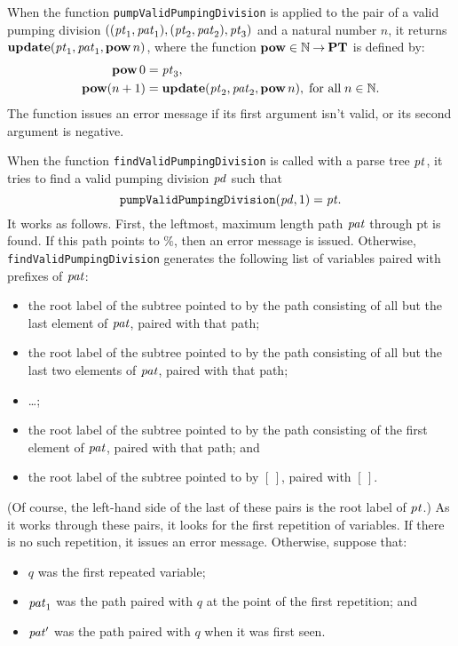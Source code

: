 When the function \texttt{pumpValidPumpingDivision} is applied to the
pair of a
valid pumping division $(({\it pt}_1, {\it pat}_1), ({\it pt}_2, {\it pat}_2), {\it pt}_3)$
and a natural number $n$,
it returns $\mathbf{update}({\it pt}_1, {\it pat}_1, \mathbf{pow}\,n)$, where the function
$\mathbf{pow}\in\mathbb{N}\mathbin{\to}\mathbf{PT}$ is defined by:
\begin{align*}
  \mathbf{pow}\,0 &= {\it pt}_3 , \\
  \mathbf{pow}(n + 1) &= \mathbf{update}({\it pt}_2, {\it pat}_2, \mathbf{pow}\,n) ,
  \;\allowbreak\mbox{for all}\allowbreak\; n\in\mathbb{N} .
\end{align*}
The function issues an error message if its first argument isn't valid,
or its second argument is negative.

When the function \texttt{findValidPumpingDivision} is called with a
parse tree ${\it pt}$, it tries to find a valid pumping division ${\it pd}$ such
that
\begin{displaymath}
\mathtt{pumpValidPumpingDivision}({\it pd}, 1) = {\it pt} .  
\end{displaymath}
It works as follows. First, the leftmost, maximum length path ${\it pat}$
through pt is found. If this path points to $\%$, then an error
message is issued. Otherwise, \texttt{findValidPumpingDivision}
generates the following list of variables paired with prefixes of
${\it pat}$:
\begin{itemize}
\item the root label of the subtree pointed to by the path consisting
  of all but the last element of ${\it pat}$, paired with that path;

\item the root label of the subtree pointed to by the path consisting
  of all but the last two elements of ${\it pat}$, paired with that path;

\item \ldots;

\item the root label of the subtree pointed to by the path consisting
  of the first element of ${\it pat}$, paired with that path; and

\item the root label of the subtree pointed to by $[\,]$, paired with $[\,]$. 
\end{itemize}
(Of course, the left-hand side of the last of these pairs is the root
label of ${\it pt}$.)
As it works through these pairs, it looks for the first
repetition of variables. If there is no such repetition, it issues an
error message. Otherwise, suppose that:
\begin{itemize}
\item $q$ was the first repeated variable;

\item ${\it pat}_1$ was the path paired with $q$ at the point of the first
  repetition; and

\item ${\it pat}'$ was the path paired with $q$ when it was first seen. 
\end{itemize}
